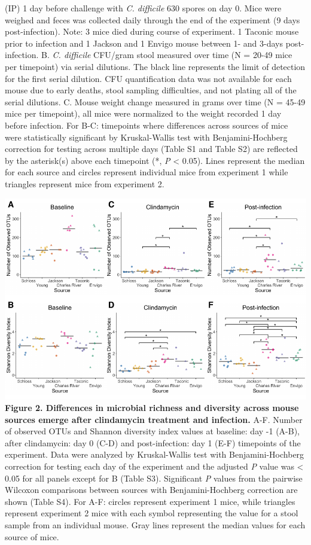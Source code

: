 \documentclass[11pt,]{article}
\begin{document}
(IP) 1 day before challenge with \emph{C. difficile} 630 spores on day
0. Mice were weighed and feces was collected daily through the end of
the experiment (9 days post-infection). Note: 3 mice died during course
of experiment. 1 Taconic mouse prior to infection and 1 Jackson and 1
Envigo mouse between 1- and 3-days post-infection. B. \emph{C.
difficile} CFU/gram stool measured over time (N = 20-49 mice per
timepoint) via serial dilutions. The black line represents the limit of
detection for the first serial dilution. CFU quantification data was not
available for each mouse due to early deaths, stool sampling
difficulties, and not plating all of the serial dilutions. C. Mouse
weight change measured in grams over time (N = 45-49 mice per
timepoint), all mice were normalized to the weight recorded 1 day before
infection. For B-C: timepoints where differences across sources of mice
were statistically significant by Kruskal-Wallis test with
Benjamini-Hochberg correction for testing across multiple days (Table S1
and Table S2) are reflected by the asterisk(s) above each timepoint (*,
\emph{P} \textless{} 0.05). Lines represent the median for each source
and circles represent individual mice from experiment 1 while triangles
represent mice from experiment 2.

\newpage

\includegraphics{figure_2.pdf} \textbf{Figure 2. Differences in
microbial richness and diversity across mouse sources emerge after
clindamycin treatment and infection.} A-F. Number of observed OTUs and
Shannon diversity index values at baseline: day -1 (A-B), after
clindamycin: day 0 (C-D) and post-infection: day 1 (E-F) timepoints of
the experiment. Data were analyzed by Kruskal-Wallis test with
Benjamini-Hochberg correction for testing each day of the experiment and
the adjusted \emph{P} value was \textless{} 0.05 for all panels except
for B (Table S3). Significant \emph{P} values from the pairwise Wilcoxon
comparisons between sources with Benjamini-Hochberg correction are shown
(Table S4). For A-F: circles represent experiment 1 mice, while
triangles represent experiment 2 mice with each symbol representing the
value for a stool sample from an individual mouse. Gray lines represent
the median values for each source of mice.
\end{document}
